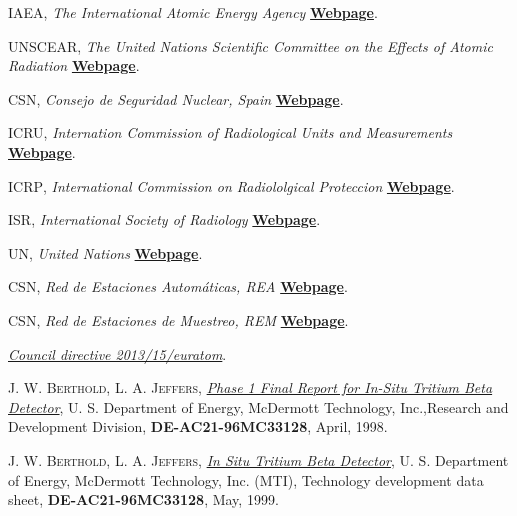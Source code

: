 \begin{thebibliography}{100}
 \textsc{IAEA}, 
\textit{The International Atomic Energy Agency} \href{https://www.iaea.org/}{\textbf{Webpage}}. 

 \textsc{UNSCEAR}, 
\textit{The United Nations Scientific Committee on the Effects of Atomic Radiation} \href{https://www.unscear.org/}{\textbf{Webpage}}. 

 \textsc{CSN}, 
\textit{Consejo de Seguridad Nuclear, Spain} \href{https://www.csn.es/home}{\textbf{Webpage}}.

 \textsc{ICRU}, 
\textit{Internation Commission of Radiological Units and Measurements} \href{https://www.icru.org/}{\textbf{Webpage}}.

 \textsc{ICRP}, 
\textit{International Commission on Radiololgical Proteccion} \href{https://www.icrp.org/}{\textbf{Webpage}}.

 \textsc{ISR}, 
\textit{International Society of Radiology} \href{https://www.isradiology.org/}{\textbf{Webpage}}.

 \textsc{UN}, 
\textit{United Nations} \href{https://www.un.org/en/}{\textbf{Webpage}}. 

 \textsc{CSN}, 
\textit{Red de Estaciones Automáticas, REA} \href{https://www.csn.es/mapa-de-valores-ambientales}{\textbf{Webpage}}. 

 \textsc{CSN}, 
\textit{Red de Estaciones de Muestreo, REM} \href{https://www.csn.es/kprgisweb2/index.html?lang=es}{\textbf{Webpage}}. 

\href{https://eur-lex.europa.eu/eli/dir/2013/59/oj}{\textit{Council directive 2013/15/euratom}}.

 \textsc{J. W. Berthold}, \textsc{L. A. Jeffers},
\href{https://www.osti.gov/biblio/2225-phase-final-report-situ-tritium-beta-detector}{\textit{Phase 1 Final Report for In-Situ Tritium Beta Detector}}, 
U. S. Department of Energy, McDermott Technology, Inc.,Research and Development Division, 	\textbf{DE-AC21-96MC33128}, April, 1998.

 \textsc{J. W. Berthold}, \textsc{L. A. Jeffers}, 
\href{https://www.osti.gov/biblio/836625-MxOOUa/native/}{\textit{In Situ Tritium Beta Detector}}, U. S. Department of Energy, McDermott Technology, Inc. (MTI), Technology development data sheet, \textbf{DE-AC21-96MC33128}, May, 1999.


\end{thebibliography}
